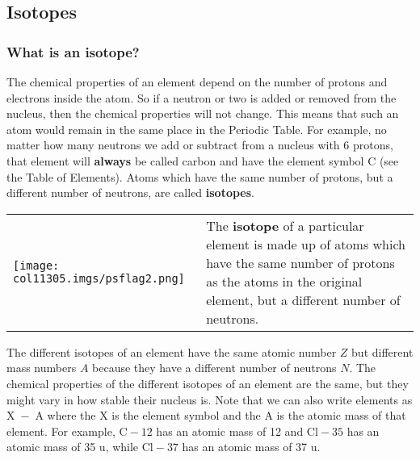             \subsection{ Isotopes}
            \nopagebreak
            \label{m38753*uid40}
            \subsubsection{ What is an isotope?}
            \nopagebreak
            \label{m38753*id257359}The chemical properties of an element depend on the number of protons and electrons inside the atom. So if a neutron or two is added or removed from the nucleus, then the chemical properties will not change. This means that such an atom would remain in the same place in the Periodic Table. For example, no matter how many neutrons we add or subtract from a nucleus with 6 protons, that element will \textbf{always} be called carbon and have the
element symbol $\mathrm{C}$ (see the Table of Elements). Atoms which have the same number of protons, but a different number of neutrons, are called \textbf{isotopes}.\par 
\label{m38753*fhsst!!!underscore!!!id386}\begin{definition}
	  \begin{tabular*}{15 cm}{m{15 mm}m{}}
	\hspace*{-50pt}  \texttt{[image: col11305.imgs/psflag2.png]}   & \Definition{   \label{id2417667}\textbf{ Isotope }} { \label{m38753*meaningfhsst!!!underscore!!!id386}
        \label{m38753*id257386}The \textbf{isotope} of a particular element is made up of atoms which have the same number of protons as the atoms in the original element, but a different number of neutrons.  \par 
         } 
      \end{tabular*}
      \end{definition}
        \label{m38753*id257405}The different isotopes of an element have the same atomic
number $Z$ but different mass numbers $A$ because they have a different
number of neutrons $N$. The chemical properties of the different
isotopes of an element are the same, but they might vary in how stable their nucleus is. Note that we can also write elements as $\mathrm{X\; -\; A}$ where the X is the element symbol and the A is the atomic mass of that element. For example, $\mathrm{C-}12$ has an atomic mass of 12 and $\mathrm{Cl-}35$ has an atomic mass of 35 u, while $\mathrm{Cl-}37$ has an atomic mass of 37 u.\par 
